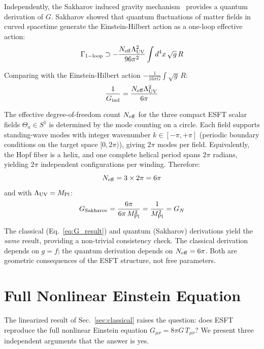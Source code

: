 ﻿\documentclass[twocolumn,preprintnumbers,amsmath,amssymb,prd]{revtex4-2}
\begin{document}
Independently, the Sakharov induced gravity mechanism~\cite{Sakharov1968} provides a quantum derivation of $G$. Sakharov showed that quantum fluctuations of matter fields in curved spacetime generate the Einstein-Hilbert action as a one-loop effective action:
\begin{equation}
\Gamma_{\rm 1-loop} \supset -\frac{N_{\rm eff}\Lambda_{\rm UV}^2}{96\pi^2}\int d^4x\,\sqrt{g}\,R
\end{equation}

Comparing with the Einstein-Hilbert action $-\frac{1}{16\pi G}\int\sqrt{g}\,R$:
\begin{equation}
\frac{1}{G_{\rm ind}} = \frac{N_{\rm eff}\Lambda_{\rm UV}^2}{6\pi}
\label{eq:Gind}
\end{equation}

The effective degree-of-freedom count $N_{\rm eff}$ for the three compact ESFT scalar fields $\Theta_a \in S^1$ is determined by the mode counting on a circle. Each field supports standing-wave modes with integer wavenumber $k \in [-\pi, +\pi]$ (periodic boundary conditions on the target space $[0,2\pi)$), giving $2\pi$ modes per field. Equivalently, the Hopf fiber is a helix, and one complete helical period spans $2\pi$ radians, yielding $2\pi$ independent configurations per winding. Therefore:
\begin{equation}
N_{\rm eff} = 3 \times 2\pi = 6\pi
\end{equation}
and with $\Lambda_{\rm UV} = M_{\rm Pl}$:
\begin{equation}
G_{\rm Sakharov} = \frac{6\pi}{6\pi\,M_{\rm Pl}^2} = \frac{1}{M_{\rm Pl}^2} = G_N
\end{equation}

The classical (Eq.~\ref{eq:G_result}) and quantum (Sakharov) derivations yield the \emph{same} result, providing a non-trivial consistency check. The classical derivation depends on $g = f$; the quantum derivation depends on $N_{\rm eff} = 6\pi$. Both are geometric consequences of the ESFT structure, not free parameters.

\section{Full Nonlinear Einstein Equation}
\label{sec:nonlinear}

The linearized result of Sec.~\ref{sec:classical} raises the question: does ESFT reproduce the full nonlinear Einstein equation $G_{\mu\nu} = 8\pi G\,T_{\mu\nu}$? We present three independent arguments that the answer is yes.
\end{document}
